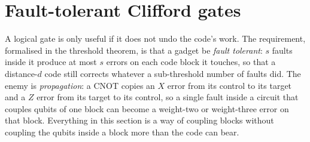 \section{Fault-tolerant Clifford gates}\label{sec:ft-clifford}

A logical gate is only useful if it does not undo the code's work. The requirement, formalised in the threshold theorem, is that a gadget be \emph{fault tolerant}: $s$ faults inside it produce at most $s$ errors on each code block it touches, so that a distance-$d$ code still corrects whatever a sub-threshold number of faults did. The enemy is \emph{propagation}: a CNOT copies an $X$ error from its control to its target and a $Z$ error from its target to its control, so a single fault inside a circuit that couples qubits of one block can become a weight-two or weight-three error on that block. Everything in this section is a way of coupling blocks without coupling the qubits inside a block more than the code can bear.

